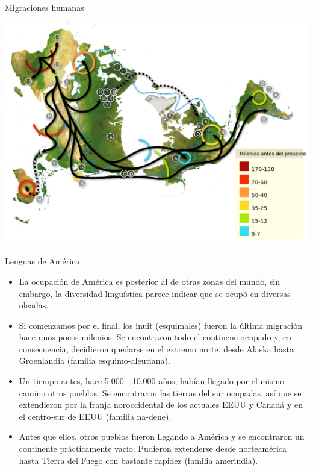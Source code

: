 \documentclass[handout]{beamer}
\begin{document}
\begin{frame}{Migraciones humanas}
\begin{center} 
  \includegraphics[scale=0.35]{img/Migraciones_humanas.png} 
\end{center}\end{frame}


\begin{frame}{Lenguas de América}
\begin{itemize}
	\item La ocupación de América es posterior al de otras zonas del mundo, sin embargo, la diversidad lingüística parece indicar que se ocupó en diversas oleadas.
	\item Si comenzamos por el final, los inuit (esquimales) fueron la última migración hace unos pocos milenios. Se encontraron todo el continene ocupado y, en consecuencia, decidieron quedarse en el extremo norte, desde Alaska hasta Groenlandia (familia esquimo-aleutiana).
	\item Un tiempo antes, hace 5.000 - 10.000 años, habían llegado por el mismo camino otros pueblos. Se encontraron las tierras del sur ocupadas, así que se extendieron por la franja noroccidental de los actuales EEUU y Canadá y en el centro-sur de EEUU (familia na-dene).
	\item Antes que ellos, otros pueblos fueron llegando a América y se encontraron un continente prácticamente vacío. Pudieron extenderse desde norteamérica hasta Tierra del Fuego con bastante rapidez (familia amerindia).
	
\end{itemize}
\end{frame}
\end{document}
